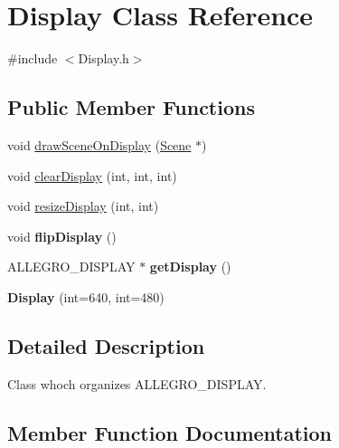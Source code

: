 \hypertarget{classDisplay}{}\section{Display Class Reference}
\label{classDisplay}


{\ttfamily \#include $<$Display.\+h$>$}

\subsection*{Public Member Functions}
\begin{DoxyCompactItemize}
\item 
void \hyperlink{classDisplay_ad735068ee75f69ff87373dc80607a6de}{draw\+Scene\+On\+Display} (\hyperlink{classScene}{Scene} $\ast$)
\item 
void \hyperlink{classDisplay_af4cf5b66237916d8c4b1baf135037202}{clear\+Display} (int, int, int)
\item 
void \hyperlink{classDisplay_a6de73ad4135258995b2deee44e1e628a}{resize\+Display} (int, int)
\item 
void {\bfseries flip\+Display} ()\hypertarget{classDisplay_a9b945675bac2549db7a392c9ef242ee5}{}\label{classDisplay_a9b945675bac2549db7a392c9ef242ee5}

\item 
A\+L\+L\+E\+G\+R\+O\+\_\+\+D\+I\+S\+P\+L\+AY $\ast$ {\bfseries get\+Display} ()\hypertarget{classDisplay_a6ea827abdef4bc9496d565296c9da61e}{}\label{classDisplay_a6ea827abdef4bc9496d565296c9da61e}

\item 
{\bfseries Display} (int=640, int=480)\hypertarget{classDisplay_ac962d82df123871e4bdc6cae9c9613e7}{}\label{classDisplay_ac962d82df123871e4bdc6cae9c9613e7}

\end{DoxyCompactItemize}


\subsection{Detailed Description}
Class whoch organizes A\+L\+L\+E\+G\+R\+O\+\_\+\+D\+I\+S\+P\+L\+AY. 

\subsection{Member Function Documentation}
